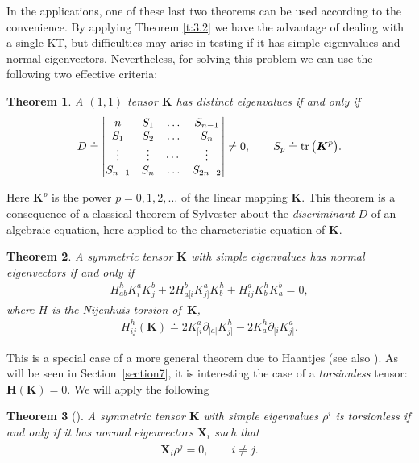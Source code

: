 \documentclass[10pt,a4paper]{amsart}
\def\bs{\boldsymbol}
\numberwithin{equation}{section}
\newtheorem{Theorem}{Theorem}[section]
 { \theoremstyle{definition}
\newtheorem{Notation}[Theorem]{Notation}
\newtheorem{Example}[Theorem]{Example}
\newtheorem{Remark}[Theorem]{Remark}
\newtheorem{Remarks}[Theorem]{Remarks}
 }
\begin{document}
In the applications, one of these last two theorems can be used according to the convenience. By applying Theorem \ref{t:3.2} we have the advantage of dealing with a single KT, but dif\/f\/iculties may arise in testing if it has simple eigenvalues and normal eigenvectors. Nevertheless, for solving this problem we can use the following two ef\/fective criteria:

\begin{Theorem}\label{t:3.6}
A $(1,1)$ tensor $\bs K$ has distinct eigenvalues if and only if
\begin{gather*}
D\doteq \vmatrix
n & S_1 & \ldots & S_{n-1} \cr
S_1 & S_2 & \ldots & S_n \cr
\vdots & \vdots & \cdots & \vdots\cr
S_{n-1} & S_n & \ldots & S_{2n-2}
\endvmatrix\neq 0, \qquad S_p\doteq \operatorname{tr}\big(\bs K^p\big).
\end{gather*}
 \end{Theorem}

Here $\bs K^p$ is the power $p=0,1,2,\ldots$ of the linear mapping $\bs K$. This theorem is a consequence of a classical theorem of Sylvester about the {\it discriminant} $D$ of an algebraic equation, here applied to the characteristic equation of $\bs K$.

\begin{Theorem}\label{t:3.7}
A symmetric tensor $\bs K$ with simple eigenvalues has normal eigenvectors if and only if
\begin{gather*}
H_{ab}^h   K^a_i K^b_j+2  H_{a[i}^b   K^a_{j]}   K^h_b+ H^a_{ij}  K^h_b K^b_a=0,
\end{gather*}
where $H$ is the Nijenhuis torsion of~$\bs K$,
\begin{gather*}
H_{ij}^h(\bs K)\doteq 2  K^a_{[i} \partial_{|a|}K_{j]}^h-2  K^h_a \partial_{[i}K^a_{j]}.
\end{gather*}
\end{Theorem}

This is a special case of a more general theorem due to Haantjes \cite{Haantjes-1955} (see also \cite[p.~248]{Schouten-1954}). As will be seen in Section~\ref{section7}, it is interesting the case of a {\it torsionless} tensor: $\bs H(\bs K)=0$. We will apply the following

\begin{Theorem}[\cite{Nijenhuis-1951}]\label{t:3.8}
A symmetric tensor $\bs K$ with simple eigenvalues $\rho^i$ is torsionless if and only if it has normal eigenvectors
$\bs X_i$ such that
\begin{gather*}
\bs X_i \rho^j=0, \qquad i\neq j.
\end{gather*}
\end{Theorem}
\end{document}
